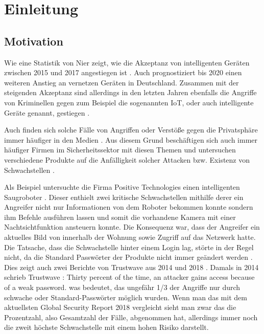 \chapter{Einleitung}

\section{Motivation}
Wie eine Statistik von Nier zeigt, wie die Akzeptanz von intelligenten Geräten zwischen 2015 und 2017 angestiegen ist \cite{nier_2017}. Auch \cite{weitemeyer_2018} prognostiziert bis 2020 einen weiteren Anstieg an vernetzen Geräten in Deutschland.
Zusammen mit der steigenden Akzeptanz sind allerdings in den letzten Jahren ebenfalls die Angriffe von Kriminellen gegen zum Beispiel die sogenannten \ac{IoT}, oder auch intelligente Geräte genannt, gestiegen \cite{statista_2019}.

Auch finden sich solche Fälle von Angriffen oder Verstöße gegen die Privatsphäre immer häufiger in den Medien \cite{holland_2016} \cite{it_verlag_informationstechnik_gmbh_2018}. Aus diesem Grund beschäftigen sich auch immer häufiger Firmen im Sicherheitssektor mit diesen Themen und untersuchen verschiedene Produkte auf die Anfälligkeit solcher Attacken bzw. Existenz von Schwachstellen \cite{lorenz_2018} \cite{ao_kaspersky_lab_2018}.

Als Beispiel untersuchte die Firma Positive Technologies einen intelligenten Saugroboter \cite{salmi_2017}.
Dieser enthielt zwei kritische Schwachstellen mithilfe derer ein Angreifer nicht nur Informationen von dem Roboter bekommen konnte sondern ihm Befehle ausführen lassen und somit die vorhandene Kamera mit einer Nachtsichtfunktion ansteuern konnte. Die Konsequenz war, dass der Angreifer ein aktuelles Bild von innerhalb der Wohnung sowie Zugriff auf das Netzwerk hatte. Die Tatsache, dass die Schwachstelle hinter einem Login lag, störte in der Regel nicht, da die Standard Passwörter der Produkte nicht immer geändert werden \cite{positive_technologies_2018}.
Dies zeigt auch zwei Berichte von Trustwave aus 2014 und 2018 \cite{trustwave_holdings_inc_2014} \cite{trustwave_holdings_inc_2018}.
Damals in 2014 schrieb Trustwave \cite{trustwave_holdings_inc_2014}: \glqq Thirty percent of the time, an attacker gains access because of a weak password.\grqq{}
was bedeutet, das ungefähr 1/3 der Angriffe nur durch schwache oder Standard-Passwörter möglich wurden. Wenn man das mit dem aktuellsten Global Security Report 2018 vergleicht sieht man zwar das die Prozentzahl, also Gesamtzahl der Fälle, abgenommen hat, allerdings immer noch die zweit höchste Schwachstelle mit einem hohen Risiko darstellt.

